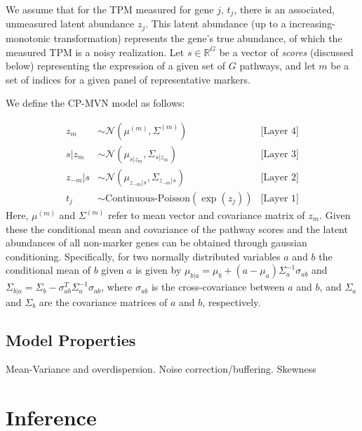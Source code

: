\documentclass[10pt]{article}
\begin{document}
We assume that for the TPM measured for gene $j$, $t_j$, there is an associated, unmeasured latent abundance $z_j$. This latent abundance (up to a increasing-monotonic transformation) represents the gene's true abundance, of which the measured TPM is a noisy realization. Let $s \in \mathbb{R}^{G}$ be a vector of \emph{scores} (discussed below) representing the expression of a given set of $G$ pathways, and let $m$ be a set of indices for a given panel of representative markers.

We define the CP-MVN model as follows:

\begin{align*}
z_m & \sim \mathcal{N}\left(\mu^{(m)}, \Sigma^{(m)}\right)  & \textrm{[Layer 4]} \\
s|z_m & \sim \mathcal{N}(\mu_{s|z_m}, \Sigma_{s|z_m})  & \textrm{[Layer 3]}\\
z_{-m}|s & \sim \mathcal{N}(\mu_{z_{-m}|s}, \Sigma_{z_{-m}|s}) & \textrm{[Layer 2]}\\
t_j & \sim \textrm{Continuous-Poisson}(\exp(z_j)) & \textrm{[Layer 1]}
\end{align*}
Here, $\mu^{(m)}$ and $\Sigma^{(m)}$ refer to mean vector and covariance matrix of $z_m$. Given these the conditional mean and covariance of the pathway scores and the latent abundances of all non-marker genes can be obtained through gaussian conditioning. Specifically, for two normally distributed variables $a$ and $b$ the conditional mean of $b$ given $a$ is given by $\mu_{b|a} = \mu_b + (a - \mu_a)\Sigma_{a}^{-1}\sigma_{ab}$ and $\Sigma_{b|a} = \Sigma_{b} - \sigma_{ab}^T\Sigma_a^{-1}\sigma_{ab}$, where $\sigma_{ab}$ is the cross-covariance between $a$ and $b$, and $\Sigma_a$ and $\Sigma_b$ are the covariance matrices of $a$ and $b$, respectively.

\subsection{Model Properties}
Mean-Variance and overdispersion. Noise correction/buffering. Skewness

\section{Inference} \label{inference}
\end{document}
